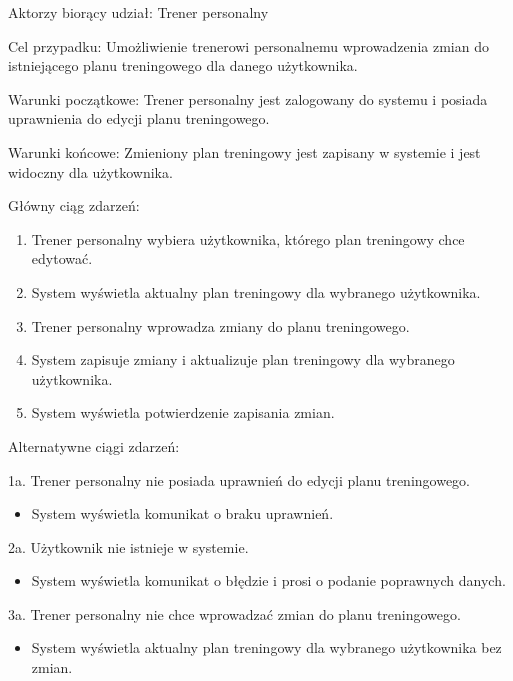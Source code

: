 \documentclass[
]{article}
\providecommand{\tightlist}{%
  \setlength{\itemsep}{0pt}\setlength{\parskip}{0pt}}
\begin{document}
{Aktorzy biorący udział: Trener personalny}

{Cel przypadku: Umożliwienie trenerowi personalnemu wprowadzenia zmian
do istniejącego planu treningowego dla danego użytkownika.}

{Warunki początkowe: Trener personalny jest zalogowany do systemu i
posiada uprawnienia do edycji planu treningowego.}

{Warunki końcowe: Zmieniony plan treningowy jest zapisany w systemie i
jest widoczny dla użytkownika.}

{Główny ciąg zdarzeń:}

\begin{enumerate}
\tightlist
\item
  {Trener personalny wybiera użytkownika, którego plan treningowy chce
  edytować.}
\item
  {System wyświetla aktualny plan treningowy dla wybranego użytkownika.}
\item
  {Trener personalny wprowadza zmiany do planu treningowego.}
\item
  {System zapisuje zmiany i aktualizuje plan treningowy dla wybranego
  użytkownika.}
\item
  {System wyświetla potwierdzenie zapisania zmian.}
\end{enumerate}

{Alternatywne ciągi zdarzeń:}

{1a. Trener personalny nie posiada uprawnień do edycji planu
treningowego.}

\begin{itemize}
\tightlist
\item
  {System wyświetla komunikat o braku uprawnień.}
\end{itemize}

{2a. Użytkownik nie istnieje w systemie.}

\begin{itemize}
\tightlist
\item
  {System wyświetla komunikat o błędzie i prosi o podanie poprawnych
  danych.}
\end{itemize}

{3a. Trener personalny nie chce wprowadzać zmian do planu treningowego.}

\begin{itemize}
\tightlist
\item
  {System wyświetla aktualny plan treningowy dla wybranego użytkownika
  bez zmian.}
\end{itemize}
\end{document}
